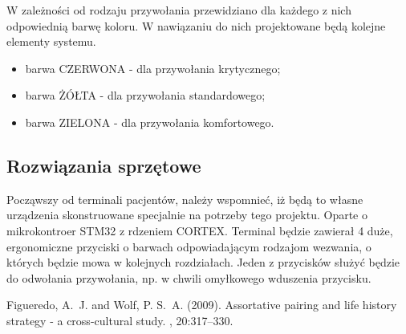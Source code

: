 \documentclass[12pt]{article} %
\begin{document}
W zależności od rodzaju przywołania przewidziano dla każdego z nich odpowiednią barwę koloru. W nawiązaniu do nich projektowane będą kolejne elementy systemu.

\begin{itemize}
\item barwa CZERWONA - dla przywołania krytycznego;
\item barwa ŻÓŁTA - dla przywołania standardowego;
\item barwa ZIELONA - dla przywołania komfortowego.
\end{itemize}
\subsection{Rozwiązania sprzętowe}

Począwszy od terminali pacjentów, należy wspomnieć, iż będą to własne urządzenia skonstruowane specjalnie na potrzeby tego projektu. Oparte o mikrokontroer STM32 z rdzeniem CORTEX. Terminal będzie zawierał 4 duże, ergonomiczne przyciski o barwach odpowiadającym rodzajom wezwania, o których będzie mowa w kolejnych rozdziałach. Jeden z przycisków służyć będzie do odwołania przywołania, np. w chwili omyłkowego wduszenia przycisku. 



\begin{thebibliography}{99} %

Figueredo, A.~J. and Wolf, P. S.~A. (2009).
\newblock Assortative pairing and life history strategy - a cross-cultural
  study.
, 20:317--330.
 
\end{thebibliography}

\end{document}
